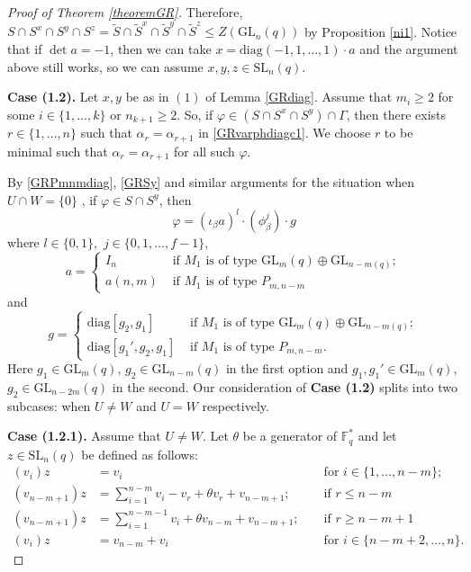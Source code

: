 \documentclass[a4paper,reqno,11pt]{amsart}
\theoremstyle{definition}
\theoremstyle{remark}
\numberwithin{equation}{section}
\newcommand{\diag}{\mathrm{diag}}
\newcommand{\SL}{{\mathrm{SL}}}
\newcommand{\GL}{{\mathrm{GL}}}
\begin{document}
\begin{proof}[Proof of Theorem {\rm \ref{theoremGR}}]
Therefore, $S\cap S^x \cap S^y \cap S^z = \tilde{S}\cap \tilde{S}^x \cap \tilde{S}^y \cap \tilde{S}^z \le Z(\GL_n(q))$ by Proposition \ref{ni1}. Notice that if $\det a=-1$, then we can take $x= \diag(-1, 1, \ldots, 1) \cdot a$ and the argument above still works, so we can assume $x,y,z \in \SL_n(q).$

\medskip

{\bf Case (1.2).}  Let $x,y$ be as in $(1)$ of Lemma \ref{GRdiag}. Assume that  $m_i\ge 2$ for some $i \in \{1, \ldots, k\}$ or $n_{k+1}\ge 2.$ So, if $\varphi \in (S \cap S^x \cap S^y) \cap  \Gamma$, then  there exists $r \in \{1, \ldots, n\}$ such that  $\alpha_r =\alpha_{r+1}$ in \eqref{GRvarphdiagc1}. We choose $r$ to be minimal such that $\alpha_r =\alpha_{r+1}$ for all such $\varphi.$

 By  \eqref{GRPmnmdiag}, \eqref{GRSy} and similar arguments for the situation when $U \cap W = \{0\}$ , if $\varphi \in S \cap S^y$, then 
\begin{equation}
\label{GRvarphisy}
\varphi = (\iota_{\beta} a )^l \cdot (\phi_{\beta}^j) \cdot g
\end{equation}
where $l \in \{0,1\},$ $j \in \{0, 1, \ldots, f-1\},$
$$a = \begin{cases}
I_n  &  \text{ if } M_1 \text{ is of type } \GL_m(q) \oplus \GL_{n-m(q)};\\
a(n,m) & \text{ if } M_1 \text{ is of type } P_{m, n-m}

\end{cases}
$$
and
$$g = 
\begin{cases}
\diag[g_2, g_1] &  \text{ if } M_1 \text{ is of type } \GL_m(q) \oplus \GL_{n-m(q)};\\
\diag[g_1', g_2, g_1] & \text{ if } M_1 \text{ is of type } P_{m, n-m}.
\end{cases}$$
Here $g_1 \in \GL_m(q)$, $g_2 \in \GL_{n-m}(q)$ in the first option and  $g_1, g_1' \in \GL_m(q)$, ${g_2 \in \GL_{n-2m}(q)}$ in the second. Our consideration of {\bf Case (1.2)} splits into two subcases:
when  $U \ne W$
and  $U=W$ respectively.

\medskip

{\bf Case (1.2.1).} Assume that $U \ne W$. Let $\theta$ be a generator of $\mathbb{F}_q^*$ and let $z \in \SL_n(q)$ be defined as follows:
\begin{equation}
\label{GRzdef1}
\begin{aligned}
(v_i)z & = v_i &&\text{ for } i \in \{1, \ldots, n-m\}; \\
(v_{n-m+1})z & =  \sum_{i=1}^{n-m} v_i -v_r + \theta v_{r} + v_{n-m+1}; && \text{ if } r \le n-m\\
(v_{n-m+1})z & =  \sum_{i=1}^{n-m-1} v_i  + \theta v_{n-m} + v_{n-m+1}; && \text{ if } r \ge n-m+1\\
(v_i)z & =  v_{n-m} + v_{i} && \text{ for } i \in \{n-m+2, \ldots, n\}.
\end{aligned} 
\end{equation}


\end{proof}
\end{document}
